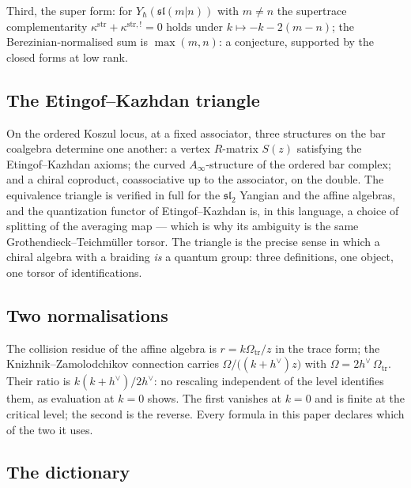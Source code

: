 \documentclass[11pt]{amsart}
\numberwithin{equation}{section}
\theoremstyle{plain}
\theoremstyle{definition}
\theoremstyle{remark}
\newcommand{\dvee}{h^{\vee}}
\begin{document}
Third, the super form: for $Y_{\hbar}(\mathfrak{sl}(m|n))$ with
$m\neq n$ the supertrace complementarity
$\kappa^{\mathrm{str}}+\kappa^{\mathrm{str},!}=0$ holds under
$k\mapsto-k-2(m-n)$; the Berezinian-normalised sum is
$\max(m,n)$: a conjecture, supported by the closed forms at low rank.

\subsection{The Etingof--Kazhdan triangle}

On the ordered Koszul locus, at a fixed associator, three structures
on the bar coalgebra determine one another: a vertex $R$-matrix
$S(z)$ satisfying the Etingof--Kazhdan axioms; the curved
$A_\infty$-structure of the ordered bar complex; and a chiral
coproduct, coassociative up to the associator, on the double. The
equivalence triangle is verified in full for the
$\mathfrak{sl}_2$ Yangian and the affine algebras, and the
quantization functor of Etingof--Kazhdan \cite{EK} is, in this
language, a choice of splitting of the averaging map --- which is why
its ambiguity is the same Grothendieck--Teichm\"uller torsor. The
triangle is the precise sense in which a chiral algebra with a
braiding \emph{is} a quantum group: three definitions, one object,
one torsor of identifications.

\subsection{Two normalisations}

The collision residue of the affine algebra is $r=k\Omega_{\mathrm{tr}}/z$
in the trace form; the Knizhnik--Zamolodchikov connection carries
$\Omega/\bigl((k+\dvee)z\bigr)$ with $\Omega=2\dvee\,\Omega_{\mathrm{tr}}$.
Their ratio is $k(k+\dvee)/2\dvee$: no rescaling independent of the level
identifies them, as evaluation at $k=0$ shows. The first vanishes at
$k=0$ and is finite at the critical level; the second is the reverse.
Every formula in this paper declares which of the two it uses.

\subsection{The dictionary}
\end{document}
